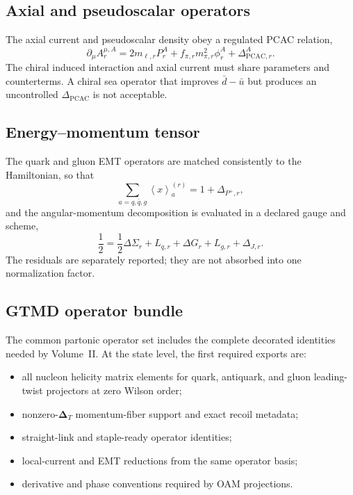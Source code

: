 \documentclass[11pt]{article}
\newcommand{\DT}{\bm{\Delta}_{T}}
\newcommand{\avg}[1]{\left\langle #1\right\rangle}
\newcommand{\PCAC}{\ensuremath{\mathrm{PCAC}}}
\begin{document}
\subsection{Axial and pseudoscalar operators}

The axial current and pseudoscalar density obey a regulated PCAC relation,
\begin{equation}
 \partial_\mu A_r^{\mu,A}
 =2m_{\ell,r}P_r^A
 +f_{\pi,r}m_{\pi,r}^2\phi_r^A
 +\Delta_{\PCAC,r}^A.
 \label{eq:pcac}
\end{equation}
The chiral induced interaction and axial current must share parameters and
counterterms.  A chiral sea operator that improves \(\bar d-\bar u\) but
produces an uncontrolled \(\Delta_{\PCAC}\) is not acceptable.

\subsection{Energy--momentum tensor}

The quark and gluon EMT operators are matched consistently to the Hamiltonian,
so that
\begin{equation}
 \sum_{a=q,\bar q,g}
 \avg{x}_a^{(r)}
 =1+\Delta_{P^+,r},
 \label{eq:momentum-sum}
\end{equation}
and the angular-momentum decomposition is evaluated in a declared gauge and
scheme,
\begin{equation}
 \frac12
 =\frac12\Delta\Sigma_r
 +L_{q,r}
 +\Delta G_r
 +L_{g,r}
 +\Delta_{J,r}.
 \label{eq:spin-sum}
\end{equation}
The residuals are separately reported; they are not absorbed into one
normalization factor.

\subsection{GTMD operator bundle}

The common partonic operator set includes the complete decorated identities
needed by Volume~II.  At the state level, the first required exports are:
\begin{itemize}
 \item all nucleon helicity matrix elements for quark, antiquark, and gluon
 leading-twist projectors at zero Wilson order;
 \item nonzero-\(\DT\) momentum-fiber support and exact recoil metadata;
 \item straight-link and staple-ready operator identities;
 \item local-current and EMT reductions from the same operator basis;
 \item derivative and phase conventions required by OAM projections.
\end{itemize}
\end{document}
